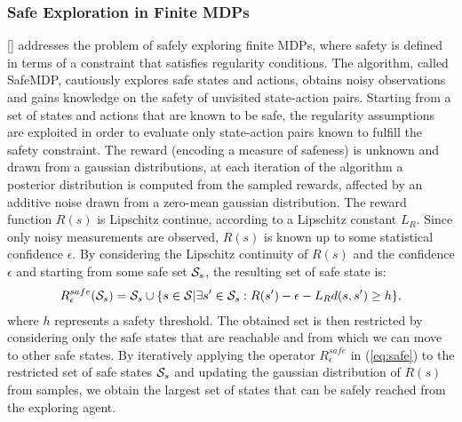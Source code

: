 \subsubsection{Safe Exploration in Finite \ac{MDPs}} \label{subsec:fmdp}
[\cite{turchetta2016}] addresses the problem of safely exploring finite \ac{MDPs}, where safety is defined in terms of a constraint that satisfies regularity conditions. The algorithm, called SafeMDP, cautiously explores safe states and actions, obtains noisy observations and gains knowledge on the safety of unvisited state-action pairs.
Starting from a set of states and actions that are known to be safe, the regularity assumptions are exploited in order to evaluate only state-action pairs known to fulfill the safety constraint.
The reward (encoding a measure of safeness) is unknown and drawn from a gaussian distributions, at each iteration of the algorithm a posterior distribution is computed from the sampled rewards, affected by an additive noise drawn from a zero-mean gaussian distribution. The reward function $R(s)$ is Lipschitz continue, according to a Lipschitz constant $L_{R}$. Since only noisy measurements are observed, $R(s)$ is known up to some statistical confidence $\epsilon$. By considering the Lipschitz continuity of $R(s)$ and the confidence $\epsilon$ and starting from some safe set $\mathcal{S}_s$, the resulting set of safe state is:
\begin{align}
R_{\epsilon}^{safe}(\mathcal{S}_s) = \mathcal{S}_s \cup \{s \in \mathcal{S} | \exists s' \in \mathcal{S}_s: R(s') - \epsilon - L_{R} d(s, s') \geq h\}, \label{eq:safe}
\end{align}
where $h$ represents a safety threshold. The obtained set is then restricted by considering only the safe states that are reachable and from which we can move to other safe states.
By iteratively applying the operator $R_{\epsilon}^{safe}$ in (\ref{eq:safe}) to the restricted set of safe states $\mathcal{S}_s$ and updating the gaussian distribution of $R(s)$ from samples, we obtain the largest set of states that can be safely reached from the exploring agent.

